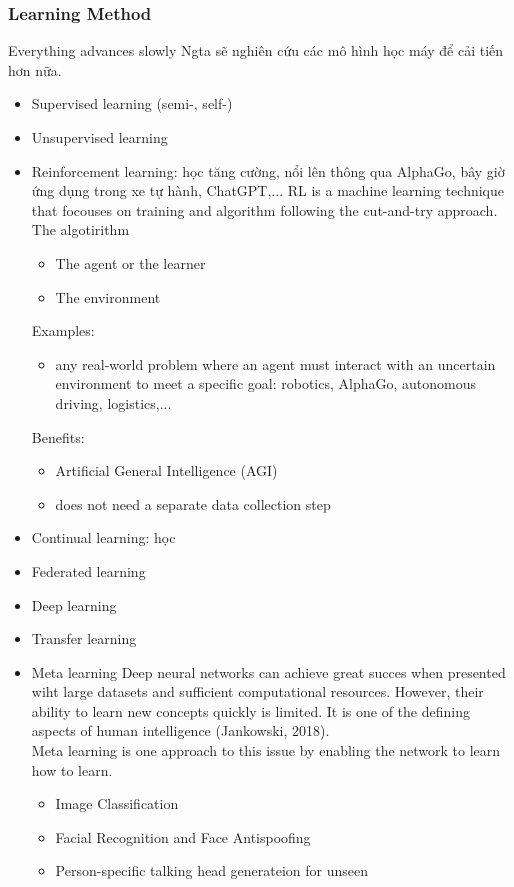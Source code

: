     \subsubsection{Learning Method}
    Everything advances slowly 
    Ngta sẽ nghiên cứu các mô hình học máy để cải tiến hơn nữa.
    \begin{itemize}
        \item Supervised learning (semi-, self-)
        \item Unsupervised learning
        \item Reinforcement learning: học tăng cường, nổi lên thông qua AlphaGo, bây giờ ứng dụng trong xe tự hành, ChatGPT,...
        RL is a machine learning technique that focouses on training and algorithm following the cut-and-try approach. The algotirithm 
        \begin{itemize}
            \item The agent or the learner
            \item The environment
        \end{itemize}
        Examples:
        \begin{itemize}
            \item any real-world problem where an agent must interact with an uncertain environment to meet a specific goal: robotics, AlphaGo, autonomous driving, logistics,...
        \end{itemize}
        Benefits:
        \begin{itemize}
            \item Artificial General Intelligence (AGI)
            \item does not need a separate data collection step
        \end{itemize}
        \item Continual learning: học
        \item Federated learning
        \item Deep learning
        \item Transfer learning
        \item Meta learning
        Deep neural networks can achieve great succes when presented wiht large datasets and sufficient computational resources. However, their ability to learn new concepts quickly is limited. It is one of the defining aspects of human intelligence (Jankowski, 2018).\\
        Meta learning is one approach to this issue by enabling the network to learn how to learn.\\
        \begin{itemize}
            \item Image Classification
            \item Facial Recognition and Face Antispoofing
            \item Person-specific talking head generateion for unseen 
        \end{itemize}
    \end{itemize}


